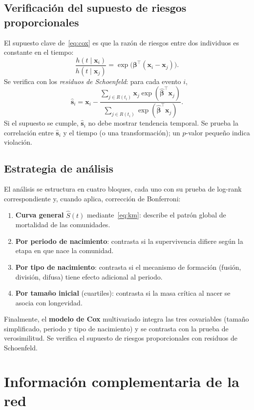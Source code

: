 \documentclass[12pt]{article}
\begin{document}
\subsection{Verificación del supuesto de riesgos proporcionales}
El supuesto clave de~\eqref{eq:cox} es que la razón de riesgos entre dos individuos es constante en el tiempo:
\[
\frac{h(t \mid \mathbf{x}_i)}{h(t \mid \mathbf{x}_j)} = \exp\bigl(\boldsymbol{\beta}^\top (\mathbf{x}_i - \mathbf{x}_j)\bigr).
\]
Se verifica con los \emph{residuos de Schoenfeld}: para cada evento $i$,
\[
\hat{\mathbf{s}}_i = \mathbf{x}_i - \frac{\sum_{j \in R(t_i)} \mathbf{x}_j \exp(\hat{\boldsymbol{\beta}}^\top \mathbf{x}_j)}{\sum_{j \in R(t_i)} \exp(\hat{\boldsymbol{\beta}}^\top \mathbf{x}_j)}.
\]
Si el supuesto se cumple, $\hat{\mathbf{s}}_i$ no debe mostrar tendencia temporal. Se prueba la correlación entre $\hat{\mathbf{s}}_i$ y el tiempo (o una transformación); un $p$-valor pequeño indica violación.

\subsection{Estrategia de análisis}
El análisis se estructura en cuatro bloques, cada uno con su prueba de log-rank correspondiente y, cuando aplica, corrección de Bonferroni:
\begin{enumerate}
\item \textbf{Curva general} $\hat{S}(t)$ mediante~\eqref{eq:km}: describe el patrón global de mortalidad de las comunidades.
\item \textbf{Por periodo de nacimiento}: contrasta si la supervivencia difiere según la etapa en que nace la comunidad.
\item \textbf{Por tipo de nacimiento}: contrasta si el mecanismo de formación (fusión, división, difusa) tiene efecto adicional al periodo.
\item \textbf{Por tamaño inicial} (cuartiles): contrasta si la masa crítica al nacer se asocia con longevidad.
\end{enumerate}
Finalmente, el \textbf{modelo de Cox} multivariado integra las tres covariables (tamaño simplificado, periodo y tipo de nacimiento) y se contrasta con la prueba de verosimilitud. Se verifica el supuesto de riesgos proporcionales con residuos de Schoenfeld.

\section{Información complementaria de la red}
\label{sec:complementaria}
\end{document}
